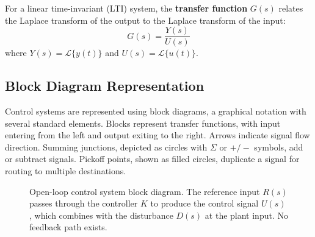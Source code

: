 \begin{definition}
For a linear time-invariant (LTI) system, the \textbf{transfer function} $G(s)$ relates the Laplace transform of the output to the Laplace transform of the input:
\begin{equation}
G(s) = \frac{Y(s)}{U(s)}
\label{eq:transfer_function}
\end{equation}
where $Y(s) = \mathcal{L}\{y(t)\}$ and $U(s) = \mathcal{L}\{u(t)\}$.
\end{definition}

\subsection{Block Diagram Representation}

Control systems are represented using block diagrams, a graphical notation with several standard elements. Blocks represent transfer functions, with input entering from the left and output exiting to the right. Arrows indicate signal flow direction. Summing junctions, depicted as circles with $\Sigma$ or $+/-$ symbols, add or subtract signals. Pickoff points, shown as filled circles, duplicate a signal for routing to multiple destinations.

\begin{figure}[htbp]
\centering
{}
\caption{Open-loop control system block diagram. The reference input $R(s)$ passes through the controller $K$ to produce the control signal $U(s)$, which combines with the disturbance $D(s)$ at the plant input. No feedback path exists.}
\label{fig:openloop_block}
\end{figure}


